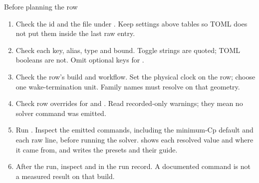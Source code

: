 \begin{frame}{Before planning the row}
\begin{enumerate}\small
  \item Check the  id and the file under .
        Keep settings above \code{[[raw]]} tables so TOML does not put them
        inside the last raw entry.
  \item Check each key, alias, type and bound. Toggle strings are quoted;
        TOML booleans are not. Omit optional keys for .
  \item Check the row's build and workflow. Set the physical clock on the
        row; choose one wake-termination unit. Family names must resolve
        on that geometry.
  \item Check row overrides for  and .
        Read recorded-only warnings; they mean no solver command was emitted.
  \item Run . Inspect the emitted commands, including
        the minimum-Cp default and each raw line, before running the solver.
         shows each resolved
        value and where it came from, and  writes the  presets and their guide.
  \item After the run, inspect  and
         in the run record. A documented command is
        not a measured result on that build.
\end{enumerate}
\end{frame}
